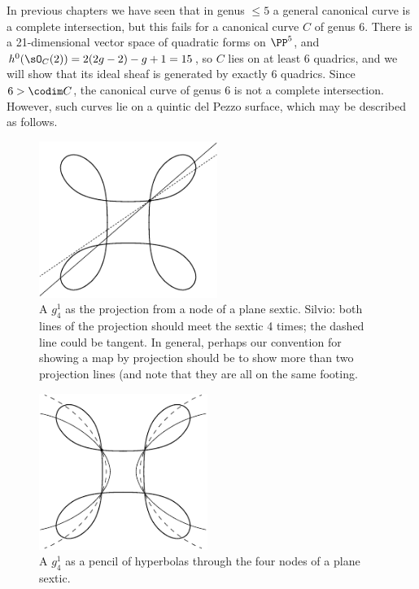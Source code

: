  In previous chapters we have seen that in genus $\leq 5$ a general canonical curve is  a complete intersection, but this fails for a canonical curve $C$ of genus 6. There is a 21-dimensional vector space of
quadratic forms on $\PP^5$, and $h^0(\sO_C(2)) = 2(2g-2)-g+1 = 15$, so $C$ lies on at least 6 quadrics, and we will show that its ideal sheaf is generated by exactly 6 quadrics. Since $6>\codim C$, the canonical curve of genus 6 is not a complete intersection. However, such curves lie on a quintic del Pezzo surface, which may be described as follows.


%
 
\begin{figure}
\centerline {\includegraphics[height=2in]{"main/Fig11-2"}}
\caption{A $g^1_4$ as the projection from a node of a plane sextic. {Silvio: both lines of the projection should meet the sextic 4 times; the dashed line could be tangent. In general, perhaps our convention for showing a map by projection should be to show more than two projection lines (and note that they are all on the same footing.}}
\label{default}
\end{figure}

\begin{figure}
\centerline {\includegraphics[height=2in]{"main/Fig11-3"}}
\caption{A $g^1_4$ as a pencil of hyperbolas through the four nodes of a plane sextic.}
\label{default}
\end{figure}
 
